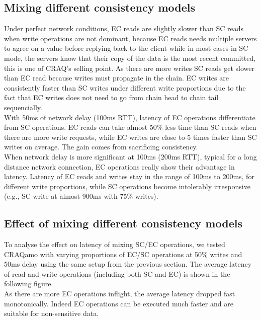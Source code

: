 \subsection{Mixing different consistency models}

Under perfect network conditions, EC reads are slightly slower than SC reads when write operations are not dominant, because EC reads needs multiple servers to agree on a value before replying back to the client while in most cases in SC mode, the servers know that their copy of the data is the most recent committed, this is one of CRAQ's selling point. As there are more writes SC reads get slower than EC read because writes must propagate in the chain. EC writes are consistently faster than SC writes under different write proportions due to the fact that EC writes does not need to go from chain head to chain tail sequencially.\\

With 50ms of network delay (100ms RTT), latency of EC operations differentiate from SC operations. EC reads can take almost 50\% less time than SC reads when there are more write requests, while EC writes are close to 5 times faster than SC writes on average. The gain comes from sacrificing consistency.\\

When network delay is more significant at 100ms (200ms RTT), typical for a long distance network connection, EC operations really show their advantage in latency. Latency of EC reads and writes stay in the range of 100ms to 200ms, for different write proportions, while SC operations become intolerably irresponsive (e.g., SC write at almost 900ms with 75\% writes).


\subsection{Effect of mixing different consistency models}
To analyse the effect on latency of mixing SC/EC operations, we tested CRAQamo with varying proportions of EC/SC operations at 50\% writes and 50ms delay using the same setup from the previous section. The average latency of read and write operations (including both SC and EC) is shown in the following figure.\\



As there are more EC operations inflight, the average latency dropped fast monotonically. Indeed EC operations can be executed much faster and are suitable for non-sensitive data.\\


